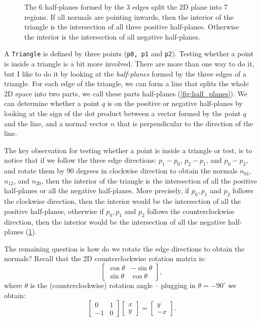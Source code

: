 \begin{figure}[t]
\begin{minipage}{0.39\linewidth}
    \caption{The 6 half-planes formed by the 3 edges split the 2D plane into 7 regions. If all normals are pointing inwards, then the interior of the triangle is the intersection of all three positive half-planes. Otherwise the interior is the intersection of all negative half-planes.}
    \label{fig:tri_half_planes}
    \end{minipage}
\end{figure}

A \lstinline{Triangle} is defined by three points (\lstinline{p0, p1} and \lstinline{p2}). Testing whether a point is inside a triangle is a bit more involved. There are more than one way to do it, but I like to do it by looking at the \emph{half-planes} formed by the three edges of a triangle. For each edge of the triangle, we can form a line that splits the whole 2D space into two parts, we call these parts half-planes (\cref{fig:half_planes}). We can determine whether a point $q$ is on the positive or negative half-planes by looking at the sign of the dot product between a vector formed by the point $q$ and the line, and a normal vector $n$ that is perpendicular to the direction of the line. 

The key observation for testing whether a point is inside a triangle or test, is to notice that if we follow the three edge directions: $p_1 - p_0$, $p_2 - p_1$, and $p_0 - p_2$, and rotate them by 90 degrees in clockwise direction to obtain the normals $n_{01}$, $n_{12}$, and $n_{20}$, then the interior of the triangle is the intersection of all the positive half-planes or all the negative half-planes. More precisely, if $p_0, p_1$ and $p_2$ follows the clockwise direction, then the interior would be the intersection of all the positive half-planes, otherwise if $p_0, p_1$ and $p_2$ follows the counterclockwise direction, then the interior would be the intersection of all the negative half-planes (\cref{fig:tri_half_planes}).

The remaining question is how do we rotate the edge directions to obtain the normals? Recall that the 2D counterclockwise rotation matrix is:
\begin{equation}
\begin{bmatrix}
\cos \theta & -\sin \theta \\
\sin \theta & \cos \theta
\end{bmatrix},
\end{equation}
where $\theta$ is the (counterclockwise) rotation angle -- plugging in $\theta = -90^{\circ}$ we obtain:
\begin{equation}
\begin{bmatrix}
0 & 1 \\
-1 & 0
\end{bmatrix}
\begin{bmatrix}
x \\ y
\end{bmatrix}
=
\begin{bmatrix}
y \\ -x
\end{bmatrix}.
\end{equation}

